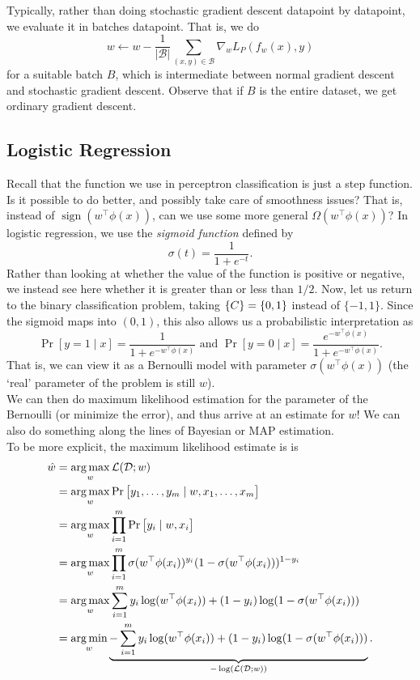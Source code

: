 \documentclass{article}
\begin{document}
			Typically, rather than doing stochastic gradient descent datapoint by datapoint, we evaluate it in batches datapoint. That is, we do
			\[ w \gets w - \frac{1}{|\mathcal{B}|} \sum_{(x,y) \in \mathcal{B}} \nabla_w L_P(f_w(x),y) \]
			for a suitable batch $B$, which is intermediate between normal gradient descent and stochastic gradient descent. Observe that if $B$ is the entire dataset, we get ordinary gradient descent.

	\subsection{Logistic Regression}

		Recall that the function we use in perceptron classification is just a step function. Is it possible to do better, and possibly take care of smoothness issues? That is, instead of $\operatorname{sign}(w^\top\phi(x))$, can we use some more general $\Omega(w^\top \phi(x))$? In logistic regression, we use the \textit{sigmoid function} defined by
		\[ \sigma(t) = \frac{1}{1+e^{-t}}. \]
		Rather than looking at whether the value of the function is positive or negative, we instead see here whether it is greater than or less than $1/2$. Now, let us return to the binary classification problem, taking $\mathcal\{C\} = \{0,1\}$ instead of $\{-1,1\}$. Since the sigmoid maps into $(0,1)$, this also allows us a probabilistic interpretation as
		\[ \Pr[y=1 \mid x] = \frac{1}{1+e^{-w^\top \phi(x)}} \text{ and } \Pr[y=0\mid x] = \frac{e^{-w^\top \phi(x)}}{1+e^{-w^\top \phi(x)}}. \]
		That is, we can view it as a Bernoulli model with parameter $\sigma(w^\top\phi(x))$ (the `real' parameter of the problem is still $w$).\\
		We can then do maximum likelihood estimation for the parameter of the Bernoulli (or minimize the error), and thus arrive at an estimate for $w$! We can also do something along the lines of Bayesian or MAP estimation.\\
		To be more explicit, the maximum likelihood estimate is is
		\begin{align*}
			\hat{w} &= \operatorname*{arg\,max}_w \mathcal{L}(\mathcal{D};w) \\
				&= \operatorname*{arg\,max}_w \Pr\left[ y_1,\ldots,y_m \mid w,x_1,\ldots,x_m \right] \\
				&= \operatorname*{arg\,max}_w \prod_{i=1}^m \Pr\left[ y_i \mid w, x_i \right] \\
				&= \operatorname*{arg\,max}_w \prod_{i=1}^m \sigma(w^\top\phi(x_i))^{y_i} (1 - \sigma(w^\top\phi(x_i)))^{1-y_i} \\
				&= \operatorname*{arg\,max}_w \sum_{i=1}^m y_i \log(w^\top \phi(x_i)) + (1 - y_i) \log(1-\sigma(w^\top\phi(x_i))) \\
				&= \operatorname*{arg\,min}_w \underbrace{- \sum_{i=1}^m y_i \log(w^\top \phi(x_i)) + (1 - y_i) \log(1-\sigma(w^\top\phi(x_i)))}_{-\log(\mathcal{L}(\mathcal{D};w))}.
		\end{align*}
\end{document}
